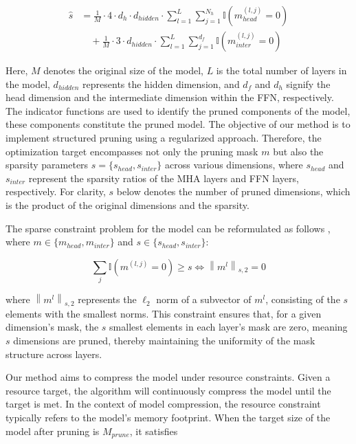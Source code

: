 \begin{equation*}
\begin{aligned} 
\hat{s} &= \frac{1}{M} \cdot 4 \cdot d_{h} \cdot d_{hidden} \cdot \sum_{l=1}^{L} \sum_{j=1}^{N_{h}} \mathbb{I}\left(m_{head}^{(l, j)}=0\right) \\
&\quad + \frac{1}{M} \cdot 3 \cdot d_{hidden} \cdot \sum_{l=1}^{L} \sum_{j=1}^{d_{f}} \mathbb{I}\left(m_{inter}^{(l, j)}=0 \right)
\end{aligned}
\end{equation*}

Here, \( M \) denotes the original size of the model, \( L \) is the total number of layers in the model, \( d_{hidden} \) represents the hidden dimension, and \( d_f \) and \( d_h \) signify the head dimension and the intermediate dimension within the FFN, respectively. The indicator functions are used to identify the pruned components of the model, these components constitute the pruned model. The objective of our method is to implement structured pruning using a regularized approach. Therefore, the optimization target encompasses not only the pruning mask $m$ but also the sparsity parameters $s=\{s_{head},s_{inter}\}$ across various dimensions, where $s_{head}$ and $s_{inter}$ represent the sparsity ratios of the MHA layers and FFN layers, respectively. For clarity, $s$ below denotes the number of pruned dimensions, which is the product of the original dimensions and the sparsity.

The sparse constraint problem for the model can be reformulated as follows \cite{tono2017efficientdcalgorithmconstrained}, where \( m \in \{ m_{head}, m_{inter} \} \) and \( s \in \{ s_{head}, s_{inter} \} \):

\begin{equation*}
\sum_j \mathbb{I} \left(  m^{(l,j)} = 0 \right) \geq s \iff \left\| m^{l} \right\|_{s,2} = 0
\end{equation*}


where \( \left\| m^{l} \right\|_{s,2} \) represents the 	$\ell_2$ norm of a subvector of \( m^{l} \), consisting of the \( s \) elements with the smallest norms. This constraint ensures that, for a given dimension's mask, the $s$ smallest elements in each layer's mask are zero, meaning $s$ dimensions are pruned, thereby maintaining the uniformity of the mask structure across layers.

Our method aims to compress the model under resource constraints. Given a resource target, the algorithm will continuously compress the model until the target is met. In the context of model compression, the resource constraint typically refers to the model's memory footprint. When the target size of the model after pruning is ${M}_{prune}$, it satisfies

